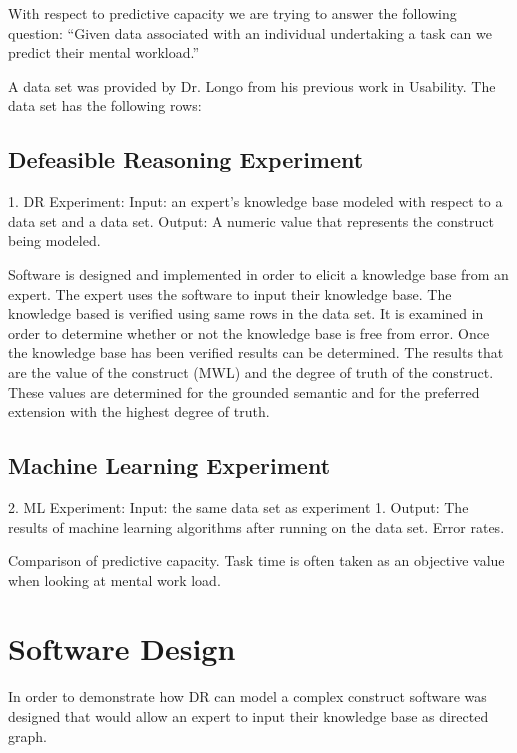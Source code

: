 With respect to predictive capacity we are trying to answer the following question: ``Given data associated with an individual undertaking a task can we predict their mental workload.''

A data set was provided by Dr. Longo from his previous work in Usability. The data set has the following rows:

\subsection{Defeasible Reasoning Experiment}


1. DR Experiment: Input: an expert's knowledge base modeled with respect to a data set and a data set. Output: A numeric value that represents the construct being modeled.


Software is designed and implemented in order to elicit a knowledge base from an expert.
The expert uses the software to input their knowledge base.
The knowledge based is verified using same rows in the data set. It is examined in order to determine whether or not the knowledge base is free from error.
Once the knowledge base has been verified results can be determined. The results that are the value of the construct (MWL) and the degree of truth of the construct. These values are determined for the grounded semantic and for the preferred extension with the highest degree of truth. 

\subsection{Machine Learning Experiment}


2. ML Experiment: Input: the same data set as experiment 1.
Output: The results of machine learning algorithms after running on the data set. Error rates.

Comparison of predictive capacity.
Task time is often taken as an objective value when looking at mental work load.




\section{Software Design}

In order to demonstrate how DR can model a complex construct software was designed that would allow an expert to input their knowledge base as directed graph.
